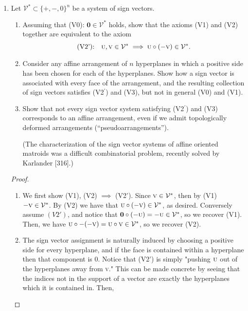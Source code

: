 \documentclass{article}
\begin{document}
\begin{enumerate}
\begin{solution}
    It suffices to guarantee that if $\sign(x_i) \neq \sign(y_i)$, then $\sign(x_i+\varepsilon y_i) = \sign(x_i)$. For this simply choose $0<\varepsilon < |\frac{x_i}{y_i}|$ for all $i$ where $x_i, y_i \neq 0$. 
\end{solution}

\item Let $\mathcal{V}^* \subset \{+,-,0\}^n$ be a system of sign vectors.
\begin{enumerate}[label=(\roman*)]
\item Assuming that (V0): $\mathbf{0}\in \mathcal{V}^*$ holds, show that the axioms (V1) and (V2) together are equivalent to the axiom
\[
\text{(V2'):\quad } \textsc{u},\textsc{v} \in \mathcal{V}^* \;\Longrightarrow\; \textsc{u}\circ(-\textsc{v})\in \mathcal{V}^*.
\]

\item Consider any affine arrangement of $n$ hyperplanes in which a positive side has been chosen for each of the hyperplanes. Show how a sign vector is associated with every face of the arrangement, and the resulting collection of sign vectors satisfies (V2$^\prime$) and (V3), but not in general (V0) and (V1).

\item Show that not every sign vector system satisfying (V2$^\prime$) and (V3) corresponds to an affine arrangement, even if we admit topologically deformed arrangements (``pseudoarrangements'').

(The characterization of the sign vector systems of affine oriented matroids was a difficult combinatorial problem, recently solved by Karlander [316].)
\end{enumerate}

\begin{proof}
\begin{enumerate}[label=(\roman*)]
    \item We first show (V1), (V2) $\implies$ (V2'). Since $\textsc{v} \in \mathcal{V}^*$, then by (V1) $-\textsc{v} \in \mathcal{V}^*$. By (V2) we have that $\textsc{u} \circ (-\textsc{v}) \in \mathcal{V}^*$, as desired. Conversely assume $(V2')$, and notice that $\textbf{0} \circ (-\textsc{u}) = -\textsc{u} \in \mathcal{V}^*$, so we recover (V1). Then, we have $\textsc{u} \circ -(-\textsc{v}) = \textsc{u} \circ \textsc{v} \in \mathcal{V}^*$, so we recover (V2).

    \item The sign vector assignment is naturally induced by choosing a positive side for every hyperplane, and if the face is contained within a hyperplane then that component is $0$. Notice that (V2') is simply "pushing $\textsc{u}$ out of the hyperplanes away from \textsc{v}." This can be made concrete by seeing that the indices not in the support of a vector are exactly the hyperplanes which it is contained in. Then, 


\end{enumerate}
\end{proof}
\end{enumerate}
\end{document}
